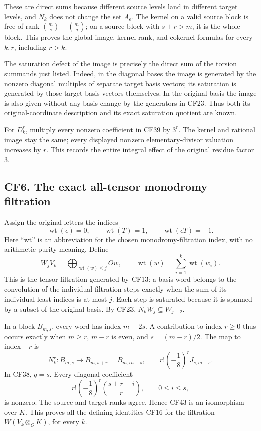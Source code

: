 These are direct sums because different source levels land in different target levels, and \(N_k\) does not change the set \(A_\epsilon\). The kernel on a valid source block is free of rank \(\binom ms-\binom mq\); on a source block with \(s+r>m\), it is the whole block. This proves the global image, kernel-rank, and cokernel formulas for every \(k,r\), including \(r>k\).

The saturation defect of the image is precisely the direct sum of the torsion summands just listed. Indeed, in the diagonal bases the image is generated by the nonzero diagonal multiples of separate target basis vectors; its saturation is generated by those target basis vectors themselves. In the original basis the image is also given without any basis change by the generators in CF23. Thus both its original-coordinate description and its exact saturation quotient are known.

For \(D_k^r\), multiply every nonzero coefficient in CF39 by \(3^r\). The kernel and rational image stay the same; every displayed nonzero elementary-divisor valuation increases by \(r\). This records the entire integral effect of the original residue factor \(3\).

\subsection{CF6. The exact all-tensor monodromy filtration}\label{cf6.-the-exact-all-tensor-monodromy-filtration}

Assign the original letters the indices
\[
 \operatorname{wt}(\epsilon)=0,\qquad
 \operatorname{wt}(T)=1,\qquad
 \operatorname{wt}(\epsilon T)=-1.
 \tag{CF41}
\]
Here ``wt'' is an abbreviation for the chosen monodromy-filtration index, with no arithmetic purity meaning. Define
\[
 W_jV_k=\bigoplus_{\operatorname{wt}(w)\leq j}Ow,
 \qquad\operatorname{wt}(w)=\sum_{i=1}^k\operatorname{wt}(w_i).
 \tag{CF42}
\]
This is the tensor filtration generated by CF13: a basis word belongs to the convolution of the individual filtration steps exactly when the sum of its individual least indices is at most \(j\). Each step is saturated because it is spanned by a subset of the original basis. By CF23, \(N_kW_j\subseteq W_{j-2}\).

In a block \(B_{m,s}\), every word has index \(m-2s\). A contribution to index \(r\geq0\) thus occurs exactly when \(m\geq r\), \(m-r\) is even, and \(s=(m-r)/2\). The map to index \(-r\) is
\[
 N_k^r:B_{m,s}\longrightarrow B_{m,s+r}=B_{m,m-s},
 \qquad r!\left(-\frac18\right)^rJ_{s,m-s}.
 \tag{CF43}
\]
In CF38, \(q=s\). Every diagonal coefficient
\[
 r!\left(-\frac18\right)^r\binom{s+r-i}{r},
 \qquad0\leq i\leq s,
 \tag{CF44}
\]
is nonzero. The source and target ranks agree. Hence CF43 is an isomorphism over \(K\). This proves all the defining identities CF16 for the filtration \(W(V_k\otimes_OK)\), for every \(k\).

